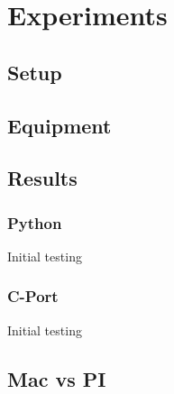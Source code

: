 
\clearpage
\section{Experiments}

\subsection{Setup}

\subsection{Equipment}

\subsection{Results}

\subsubsection{Python}
Initial testing

\subsubsection{C-Port}
Initial testing
\subsection{Mac vs PI}

